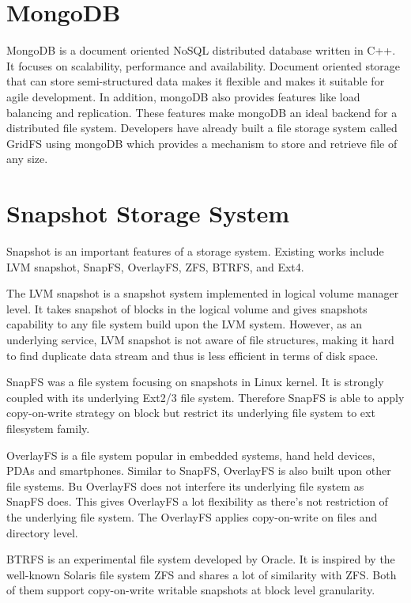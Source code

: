 \section{MongoDB}

    MongoDB is a document oriented NoSQL distributed database written in C++. It focuses on scalability, performance and availability. Document oriented storage that can store semi-structured data makes it flexible and makes it suitable for agile development. In addition, mongoDB also provides features like load balancing and replication. These features make mongoDB an ideal backend for a distributed file system. Developers have already built a file storage system called GridFS using mongoDB which provides a mechanism to store and retrieve file of any size.

\section{Snapshot Storage System}

    Snapshot is an important features of a storage system. Existing works include LVM snapshot, SnapFS, OverlayFS, ZFS, BTRFS, and Ext4.
    
    The LVM snapshot is a snapshot system implemented in logical volume manager level. It takes snapshot of blocks in the logical volume and gives snapshots capability to any file system build upon the LVM system. However, as an underlying service, LVM snapshot is not aware of file structures, making it hard to find duplicate data stream and thus is less efficient in terms of disk space.
    
    SnapFS was a file system focusing on snapshots in Linux kernel. It is strongly coupled with its underlying Ext2/3 file system. Therefore SnapFS is able to apply copy-on-write strategy on block but restrict its underlying file system to ext filesystem family. 
    
    OverlayFS is a file system popular in embedded systems, hand held devices, PDAs and smartphones. Similar to SnapFS, OverlayFS is also built upon other file systems. Bu OverlayFS does not interfere its underlying file system as SnapFS does. This gives OverlayFS a lot flexibility as there's not restriction of the underlying file system. The OverlayFS applies copy-on-write on files and directory level.

    BTRFS is an experimental file system developed by Oracle. It is inspired by the well-known Solaris file system ZFS and shares a lot of similarity with ZFS. Both of them support copy-on-write writable snapshots at block level granularity.
    
